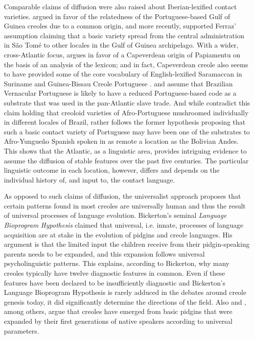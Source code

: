 \documentclass[output=paper,
modfonts
]{langscibook}
\begin{document}
Comparable claims of diffusion were also raised about Iberian-lexified contact varieties. \cite{ferraz1987portuguese} argued in favor of the relatedness of the Portuguese-based Gulf of Guinea creoles due to a common origin, and more recently, \cite{hagemeijer2011gulf} supported Ferraz’ assumption claiming that a basic variety spread from the central administration in São Tomé to other locales in the Gulf of Guinea archipelago. With a wider, cross-Atlantic focus, \cite{jacobs2009upper} argues in favor of a Capeverdean origin of Papiamentu on the basis of an analysis of the lexicon; and in fact, Capeverdean creole also seems to have provided some of the core vocabulary of English-lexified Saramaccan in Suriname and Guinea-Bissau Creole Portuguese \citep{jacobsetal2016relevance}. \cite{mello1996genesis} and \cite[29]{lipski2005history} assume that Brazilian Vernacular Portuguese is likely to have a reduced Portuguese-based code as a substrate that was used in the pan-Atlantic slave trade. And while \cite{lucchesietal2009portugues} contradict this claim holding that creoloid varieties of Afro-Portuguese mushroomed individually in different locales of Brazil, \cite{perez2015traces} rather follows the former hypothesis proposing that such a basic contact variety of Portuguese may have been one of the substrates to Afro-Yungueño Spanish spoken in as remote a location as the Bolivian Andes. This shows that the Atlantic, as a linguistic area, provides intriguing evidence to assume the diffusion of stable features over the past five centuries. The particular linguistic outcome in each location, however, differs and depends on the individual history of, and input to, the contact language.

As opposed to such claims of diffusion, the universalist approach proposes that certain patterns found in most creoles are universally human and thus the result of universal processes of language evolution. Bickerton’s seminal \emph{Language Bioprogram Hypothesis} \citep{bickerton1981roots} claimed that universal, i.e. innate, processes of language acquisition are at stake in the evolution of pidgins and creole languages. His argument is that the limited input the children receive from their pidgin-speaking parents needs to be expanded, and this expansion follows universal psycholinguistic patterns. This explains, according to Bickerton, why many creoles typically have twelve diagnostic features in common. Even if these features have been declared to be insufficiently diagnostic and Bickerton’s Language Bioprogram Hypothesis is rarely adduced in the debates around creole genesis today, it did significantly determine the directions of the field. Also \cite{mcworther1995sisters} and \cite{parkvall2000out}, among others, argue that creoles have emerged from basic pidgins that were expanded by their first generations of native speakers according to universal parameters.
\end{document}
